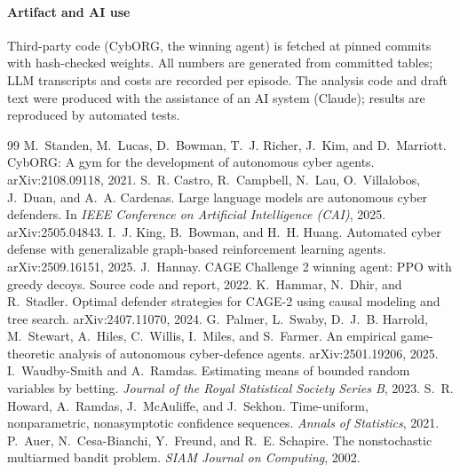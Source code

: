 \documentclass[conference,compsoc]{IEEEtran}
\begin{document}
\paragraph{Artifact and AI use} Third-party code (CybORG, the winning agent) is fetched at
pinned commits with hash-checked weights. All numbers are generated from committed
tables; LLM transcripts and costs are recorded per episode. The analysis code and draft
text were produced with the assistance of an AI system (Claude); results are reproduced
by automated tests.

\begin{thebibliography}{99}
 M.~Standen, M.~Lucas, D.~Bowman, T.~J. Richer, J.~Kim, and
D.~Marriott. CybORG: A gym for the development of autonomous cyber agents.
arXiv:2108.09118, 2021.
 S.~R. Castro, R.~Campbell, N.~Lau, O.~Villalobos, J.~Duan, and
A.~A. Cardenas. Large language models are autonomous cyber defenders. In \emph{IEEE
Conference on Artificial Intelligence (CAI)}, 2025. arXiv:2505.04843.
 I.~J. King, B.~Bowman, and H.~H. Huang. Automated cyber defense
with generalizable graph-based reinforcement learning agents. arXiv:2509.16151, 2025.
 J.~Hannay. CAGE Challenge 2 winning agent: PPO with greedy
decoys. Source code and report, 2022.
 K.~Hammar, N.~Dhir, and R.~Stadler. Optimal defender
strategies for CAGE-2 using causal modeling and tree search. arXiv:2407.11070, 2024.
 G.~Palmer, L.~Swaby, D.~J.~B. Harrold, M.~Stewart, A.~Hiles,
C.~Willis, I.~Miles, and S.~Farmer. An empirical game-theoretic analysis of autonomous
cyber-defence agents. arXiv:2501.19206, 2025.
 I.~Waudby-Smith and A.~Ramdas. Estimating means of
bounded random variables by betting. \emph{Journal of the Royal Statistical Society
Series B}, 2023.
 S.~R. Howard, A.~Ramdas, J.~McAuliffe, and J.~Sekhon.
Time-uniform, nonparametric, nonasymptotic confidence sequences. \emph{Annals of
Statistics}, 2021.
 P.~Auer, N.~Cesa-Bianchi, Y.~Freund, and R.~E. Schapire. The
nonstochastic multiarmed bandit problem. \emph{SIAM Journal on Computing}, 2002.
\end{thebibliography}
\end{document}
